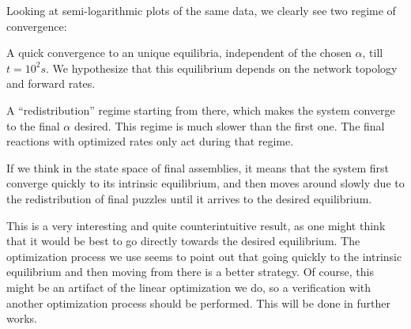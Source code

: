        Looking at semi-logarithmic plots of the same data, we clearly see two regime of convergence:

        \begin{my_itemize}
            \item A quick convergence to an unique equilibria, independent of the chosen $\alpha$, till $t=10^2 s$. We hypothesize that this equilibrium depends on the network topology and forward rates.
            \item A ``redistribution'' regime starting from there, which makes the system converge to the final $\alpha$ desired. This regime is much slower than the first one. The final reactions with optimized rates only act during that regime.
        \end{my_itemize}

        If we think in the state space of final assemblies, it means that the system first converge quickly to its intrinsic equilibrium, and then moves around slowly due to the redistribution of final puzzles until it arrives to the desired equilibrium.

        This is a very interesting and quite counterintuitive result, as one might think that it would be best to go directly towards the desired equilibrium. The optimization process we use seems to point out that going quickly to the intrinsic equilibrium and then moving from there is a better strategy. Of course, this might be an artifact of the linear optimization we do, so a verification with another optimization process should be performed. This will be done in further works.



